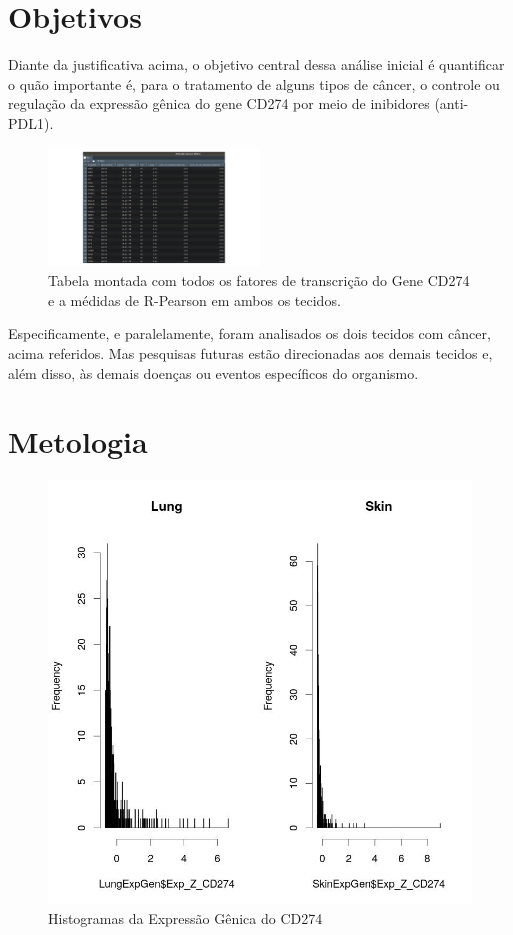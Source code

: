 \documentclass[a4paper,12pt]{article}
\begin{document}
\section{Objetivos} \label{sec:firstpage}

Diante da justificativa acima, o objetivo central dessa análise inicial é quantificar o quão importante é, para o tratamento de alguns tipos de câncer, o controle ou regulação da expressão gênica do gene CD274
por meio de inibidores (anti-PDL1).

\begin{figure}[h!]
\centering
\includegraphics[width=0.5\textwidth]{table_TFs.jpg}
\caption{Tabela montada com todos os fatores de transcrição do Gene CD274 e a médidas de R-Pearson em ambos os tecidos.}
\label{fig:TesteNorm}
\end{figure}

Especificamente, e paralelamente, foram analisados os dois tecidos
com câncer, acima referidos. Mas pesquisas futuras estão direcionadas aos demais tecidos e, além disso,
às demais doenças ou eventos específicos do organismo.

\section{Metologia} \label{sec:firstpage}

\begin{figure}[h!]
\centering
\includegraphics[width=0.7 \textwidth]{plot_histogramas.jpeg}
\caption{Histogramas da Expressão Gênica do CD274}
\label{fig:Hist1}
\end{figure}
\end{document}
